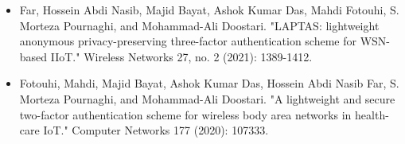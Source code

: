 
\begin{cvparagraph}
  \begin{itemize}[leftmargin=*]
    \item Far, Hossein Abdi Nasib, Majid Bayat, Ashok Kumar Das, Mahdi Fotouhi, S. Morteza Pournaghi, and Mohammad-Ali Doostari. "LAPTAS: lightweight anonymous privacy-preserving three-factor authentication scheme for WSN-based IIoT." Wireless Networks 27, no. 2 (2021): 1389-1412.
    \item Fotouhi, Mahdi, Majid Bayat, Ashok Kumar Das, Hossein Abdi Nasib Far, S. Morteza Pournaghi, and Mohammad-Ali Doostari. "A lightweight and secure two-factor authentication scheme for wireless body area networks in health-care IoT." Computer Networks 177 (2020): 107333.
  \end{itemize}
\end{cvparagraph}
